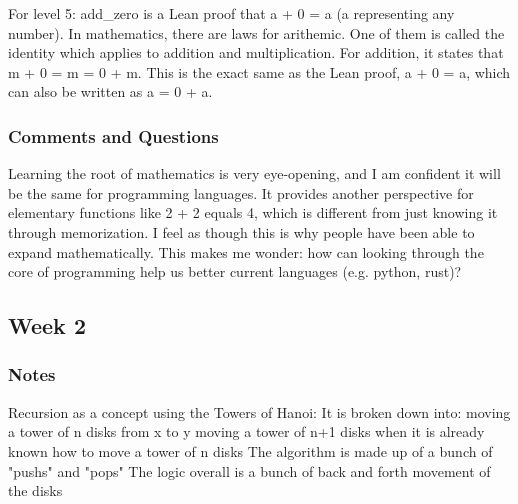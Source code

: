 \documentclass{article}
\theoremstyle{theorem}
\theoremstyle{definition}
\theoremstyle{remark}
\begin{document}
For level 5: 
add\_zero is a Lean proof that a + 0 = a (a representing any number). In mathematics, there are laws for arithemic. One of them 
is called the identity which applies to addition and multiplication. For addition, it states that m + 0 = m = 0 + m. This is the
exact same as the Lean proof, a + 0 = a, which can also be written as a = 0 + a.

%
%

\subsubsection*{Comments and Questions}
Learning the root of mathematics is very eye-opening, and I am confident it will be the same for programming languages. 
It provides another perspective for elementary functions like 2 + 2 equals 4, which is different from just knowing it through memorization. 
I feel as though this is why people have been able to expand mathematically. This makes me wonder: how can looking through the core of 
programming help us better current languages (e.g. python, rust)?

\subsection{Week 2}

\subsubsection*{Notes}
Recursion as a concept using the Towers of Hanoi:
It is broken down into:
 moving a tower of n disks from x to y
 moving a tower of n+1 disks when it is already known how to move a tower of n disks
The algorithm is made up of a bunch of "pushs" and "pops"
The logic overall is a bunch of back and forth movement of the disks 
\end{document}
